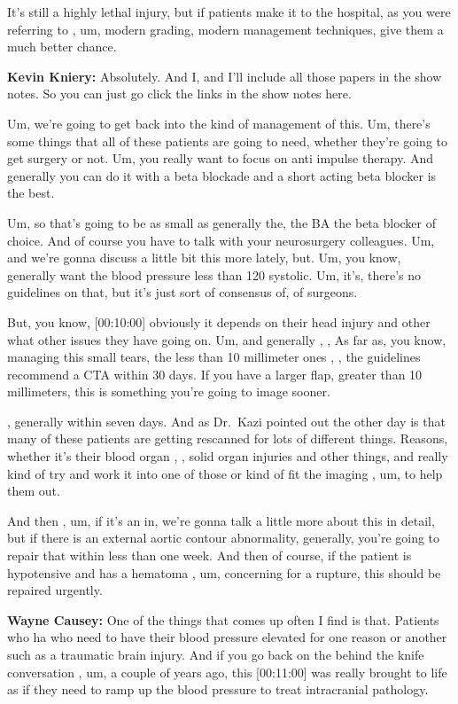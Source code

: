 \documentclass[
]{book}
\begin{document}
It's still a highly lethal injury, but if patients make it to the
hospital, as you were referring to , um, modern grading, modern
management techniques, give them a much better chance.

\textbf{Kevin Kniery:} Absolutely. And I, and I'll include all those papers
in the show notes. So you can just go click the links in the show notes
here.

Um, we're going to get back into the kind of management of this. Um,
there's some things that all of these patients are going to need,
whether they're going to get surgery or not. Um, you really want to
focus on anti impulse therapy. And generally you can do it with a beta
blockade and a short acting beta blocker is the best.

Um, so that's going to be as small as generally the, the BA the beta
blocker of choice. And of course you have to talk with your neurosurgery
colleagues. Um, and we're gonna discuss a little bit this more lately,
but. Um, you know, generally want the blood pressure less than 120
systolic. Um, it's, there's no guidelines on that, but it's just sort of
consensus of, of surgeons.

But, you know, {[}00:10:00{]} obviously it depends on their head injury and
other what other issues they have going on. Um, and generally , , As far
as, you know, managing this small tears, the less than 10 millimeter
ones , , the guidelines recommend a CTA within 30 days. If you have a
larger flap, greater than 10 millimeters, this is something you're going
to image sooner.

, generally within seven days. And as Dr.~Kazi pointed out the other day
is that many of these patients are getting rescanned for lots of
different things. Reasons, whether it's their blood organ , , solid
organ injuries and other things, and really kind of try and work it into
one of those or kind of fit the imaging , um, to help them out.

And then , um, if it's an in, we're gonna talk a little more about this
in detail, but if there is an external aortic contour abnormality,
generally, you're going to repair that within less than one week. And
then of course, if the patient is hypotensive and has a hematoma , um,
concerning for a rupture, this should be repaired urgently.

\textbf{Wayne Causey:} One of the things that comes up often I find is that.
Patients who ha who need to have their blood pressure elevated for one
reason or another such as a traumatic brain injury. And if you go back
on the behind the knife conversation , um, a couple of years ago, this
{[}00:11:00{]} was really brought to life as if they need to ramp up the
blood pressure to treat intracranial pathology.
\end{document}
